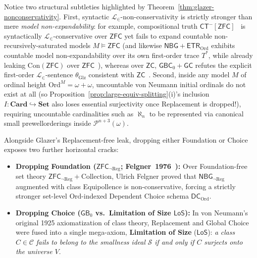 Notice two structural subtleties highlighted by Theorem~\ref{thm:glazer-nonconservativity}. First, syntactic $\mathcal{L}_\in$-non-conservativity is strictly stronger than mere \emph{model non-expandability}: for example, compositional truth $\mathsf{CT}^-[\mathsf{ZFC}]$~\cite{Fujimoto12} is syntactically $\mathcal{L}_\in$-conservative over $\mathsf{ZFC}$ yet fails to expand countable non-recursively-saturated models $M \models \mathsf{ZFC}$ (and likewise $\mathsf{NBG} + \mathsf{ETR}_{\mathrm{Ord}}$ exhibits countable model non-expandability over its own first-order trace $T^*$, while already leaking $\mathrm{Con}(\mathsf{ZFC})$ over $\mathsf{ZFC}$~\cite[Thm.~1.2]{Gitman20}), whereas over $\mathsf{ZC}$, $\mathsf{GBC}_0 + \mathsf{GC}$ refutes the explicit first-order $\mathcal{L}_\in$-sentence $\theta_{\mathrm{Glz}}$ consistent with $\mathsf{ZC}$~\cite{Glazer23}. Second, inside any model $M$ of ordinal height $\mathrm{Ord}^M = \omega + \omega$, uncountable von Neumann initial ordinals do not exist at all (so Proposition~\ref{prop:large-equiv-splitting}(i)'s inclusion $I : \mathbf{Card} \hookrightarrow \mathbf{Set}$ also loses essential surjectivity once Replacement is dropped!), requiring uncountable cardinalities such as $\aleph_n$ to be represented via canonical small prewellorderings inside $\mathcal{P}^{n+3}(\omega)$.

Alongside Glazer's Replacement-free leak, dropping either Foundation or Choice exposes two further horizontal cracks:
\begin{itemize}[leftmargin=1.5em]
  \item \textbf{Dropping Foundation ($\mathsf{ZFC}_{\neg\mathrm{Reg}}$; Felgner~1976~\cite{Felgner76}):} Over Foundation-free set theory $\mathsf{ZFC}_{\neg\mathrm{Reg}} + \mathrm{Collection}$, Ulrich Felgner proved that $\mathsf{NBG}_{\neg\mathrm{Reg}}$ augmented with class Equipollence is non-conservative, forcing a strictly stronger set-level $\mathrm{Ord}$-indexed Dependent Choice schema $\mathsf{DC}_{\mathrm{Ord}}$.
  \item \textbf{Dropping Choice ($\mathsf{GB}_0$ vs.\ Limitation of Size $\mathsf{LoS}$):} In von Neumann's original 1925 axiomatization of class theory, Replacement and Global Choice were fused into a single mega-axiom, \textbf{Limitation of Size} ($\mathsf{LoS}$): \emph{a class $C \in \mathcal{C}$ fails to belong to the smallness ideal $\mathcal{S}$ if and only if $C$ surjects onto the universe $V$}.
\end{itemize}

